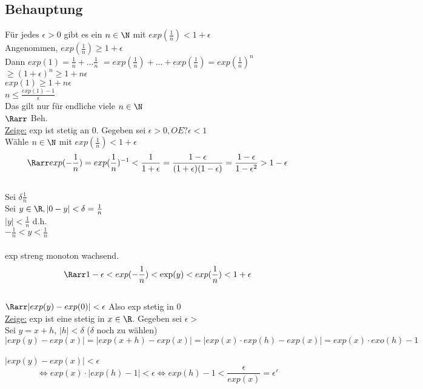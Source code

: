 \subsection*{Behauptung}
Für jedes $\epsilon > 0$ gibt es ein $n \in \N$ mit $exp(\frac{1}{n}) < 1 + \epsilon$\\
Angenommen, $exp(\frac{1}{n}) \geq 1 + \epsilon$\\
Dann $exp(1) = \frac{1}{n} + ... \frac{1}{n}$ %
\phantom{Dann $exp(1) $} $= exp(\frac{1}{n}) + ... + exp(\frac{1}{n}) = exp(\frac{1}{n})^n$ \\
\phantom{Dann $exp(1) $} $ \geq (1 + \epsilon)^n \geq 1 + n \epsilon $ %
\\
$exp(1) \geq 1 + n \epsilon$\\
$n \leq \frac{exp(1) - 1}{\epsilon}$\\
Das gilt nur für endliche viele $n \in \N$\\
$\Rarr$ Beh.\\
\underline{Zeige:} exp ist stetig an 0. Gegeben sei $\epsilon > 0, OE ? \epsilon < 1$\\
Wähle $n \in \N$ mit $exp(\frac{1}{n}) < 1 + \epsilon$\\
$$\Rarr exp(-\frac{1}{n}) = exp(\frac{1}{n})^{-1} < \frac{1}{1 + \epsilon} = \frac{1 - \epsilon}{(1+\epsilon)(1-\epsilon)} = \frac{1-\epsilon}{1 - \epsilon^2} > 1 - \epsilon$$\\
Sei $\delta \frac{1}{n}$\\
Sei $y \in \R, |0 - y| < \delta = \frac{1}{n}$\\
$|y| < \frac{1}{n}$ d.h.\\
$-\frac{1}{n} < y < \frac{1}{n}$\\ \\
exp streng monoton wachsend.\\
$$\Rarr 1 - \epsilon < exp(-\frac{1}{n}) < \exp(y) < exp(\frac{1}{n}) < 1 + \epsilon$$\\
$\Rarr |exp(y) - exp(0)| < \epsilon$ Also exp stetig in 0\\
\underline{Zeige:} exp ist eine stetig in $x \in \R$. Gegeben sei $\epsilon > $\\
Sei $y = x + h$, $|h| < \delta$ ($\delta$ noch zu wählen)
$$|exp(y) - exp(x)| = |exp(x + h) - exp(x)| = |exp(x) \cdot exp(h) - exp(x)| = exp(x) \cdot exo(h) -1$$\\
$|exp(y) -exp(x) | < \epsilon$\\
$$\Leftrightarrow exp(x) \cdot |exp(h) - 1| < \epsilon \Leftrightarrow exp(h) - 1 < \frac{\epsilon}{exp(x)} = \epsilon '$$\\
